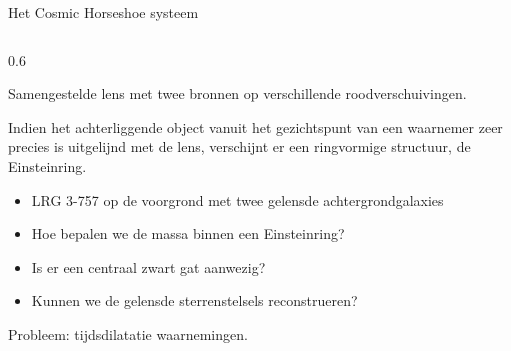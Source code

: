 \documentclass[aspectratio=169,xcolor=dvipsnames]{beamer}
\begin{document}
\begin{frame}{Het Cosmic Horseshoe systeem}
    \begin{columns}[T] %
        
        \begin{column}{0.6\textwidth}
            \small

    

            Samengestelde lens met twee bronnen op verschillende roodverschuivingen.
            \vspace{0.2cm}

            Indien het achterliggende object vanuit het gezichtspunt van een waarnemer zeer precies is uitgelijnd met de lens, verschijnt er een ringvormige structuur, de Einsteinring.

            \vspace{0.4cm}
            \begin{itemize}
                \item LRG 3-757 op de voorgrond met twee gelensde achtergrondgalaxies
                \item Hoe bepalen we de massa binnen een Einsteinring? 
                \item Is er een centraal zwart gat aanwezig?
                \item Kunnen we de gelensde sterrenstelsels reconstrueren?
            \end{itemize}

            \vspace{0.4cm}
             Probleem: tijdsdilatatie waarnemingen.
        \end{column}


\end{columns}
\end{frame}
\end{document}
